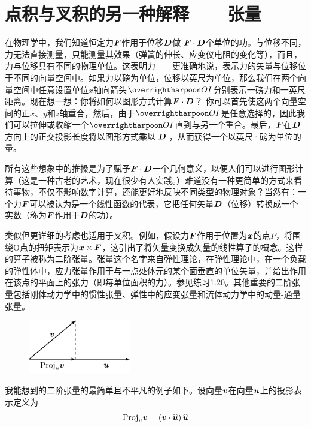 \section{点积与叉积的另一种解释——张量}
在物理学中，我们知道恒定力$\boldsymbol{F}$作用于位移$\boldsymbol{D}$做 $\boldsymbol{F}\cdot \boldsymbol{D}$个单位的功。与位移不同，力无法直接测量，只能测量其效果（弹簧的伸长、应变仪电阻的变化等），而且，力与位移具有不同的物理单位。这表明力——更准确地说，表示力的矢量与位移位于不同的向量空间中。如果力以磅为单位，位移以英尺为单位，那么我们在两个向量空间中任意设置单位$x$轴向箭头$\rr{OI}$分别表示一磅力和一英尺距离。现在想一想：你将如何以图形方式计算$\boldsymbol{F}\cdot \boldsymbol{D}$？ 你可以首先使这两个向量空间的正$x$、$y$和$z$轴重合，然后，由于$\rr{OI}$是任意选择的，因此我们可以拉伸或收缩一个$\rr{OI}$直到与另一个重合。最后，$\boldsymbol{F}$在$\boldsymbol{D}$方向上的正交投影长度将以图形方式乘以$\left| \boldsymbol{D} \right|$，从而获得一个以英尺·磅为单位的量。

所有这些想象中的推搡是为了赋予$\boldsymbol{F}\cdot \boldsymbol{D}$一个几何意义，以便人们可以进行图形计算（这是一种古老的艺术，现在很少有人实践。）难道没有一种更简单的方式来看待事物，不仅不影响数字计算，还能更好地反映不同类型的物理对象？当然有：一个力$\boldsymbol{F}$可以被认为是一个线性函数的代表，它把任何矢量$\boldsymbol{D}$（位移）转换成一个实数（称为$\boldsymbol{F}$作用于$\boldsymbol{D}$的功）。

类似但更详细的考虑也适用于叉积。例如，假设力$\boldsymbol{F}$作用于位置为$\boldsymbol{x}$的点$P$，将围绕O点的扭矩表示为$\boldsymbol{x}\times \boldsymbol{F}$，这引出了将矢量变换成矢量的线性算子的概念。这样的算子被称为二阶张量。张量这个名字来自弹性理论，在弹性理论中，在一个负载的弹性体中，应力张量作用于与一点处体元的某个面垂直的单位矢量，并给出作用在该点的平面上的张力（即每单位面积的力）。参见练习1.20。其他重要的二阶张量包括刚体动力学中的惯性张量、弹性中的应变张量和流体动力学中的动量-通量张量。

\begin{figure}[htbp]
	\centering
	\includegraphics[width=0.4\textwidth]{./image/1.8.pdf}
	\caption{}
	\label{fig:1.8}
\end{figure}

我能想到的二阶张量的最简单且不平凡的例子如下。设向量$\boldsymbol{v}$在向量$\boldsymbol{u}$上的投影表示定义为
\begin{equation}\label{equ:1.27}
    \mathrm{Proj}_u\boldsymbol{v}=\left( \boldsymbol{v}\cdot \widehat{\boldsymbol{u}} \right) \widehat{\boldsymbol{u}}
\end{equation}

